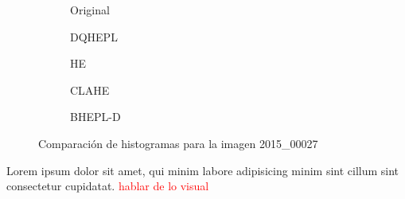 \documentclass[sigchi]{acmart}
\newcommand{\rojo}[1]{\textcolor{red}{#1}}
\begin{document}
\begin{figure}[htbp]
	\centering
	\begin{subfigure}[b]{0.45\textwidth}
		\resizebox{\linewidth}{!}{}
		\caption{Original}
		\label{fig:original_3}
	\end{subfigure}
	\hfill
	\begin{subfigure}[b]{0.45\textwidth}
		\resizebox{\linewidth}{!}{}
		\caption{DQHEPL}
		\label{fig:dqhepl_3}
	\end{subfigure}

	\begin{subfigure}[b]{0.45\textwidth}
		\resizebox{\linewidth}{!}{}
		\caption{HE}
		\label{fig:he_3}
	\end{subfigure}
	\hfill
	\begin{subfigure}[b]{0.45\textwidth}
		\resizebox{\linewidth}{!}{}
		\caption{CLAHE}
		\label{fig:clahe_3}
	\end{subfigure}

	\centering
	\begin{subfigure}[b]{0.45\textwidth}
		\resizebox{\linewidth}{!}{}
		\caption{BHEPL-D}
		\label{fig:bhepl_3}
	\end{subfigure}

	\caption{Comparación de histogramas para la imagen 2015\_00027}
	\label{fig:histogramas_3}
\end{figure}

Lorem ipsum dolor sit amet, qui minim labore adipisicing minim sint cillum sint consectetur cupidatat.
\rojo{hablar de lo visual}
\end{document}
